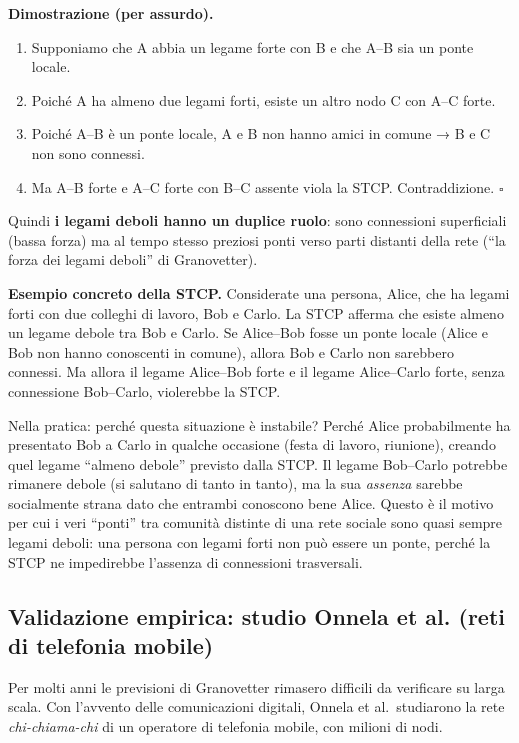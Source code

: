 \documentclass[12pt,a4paper]{article}
\begin{document}
\medskip
\noindent\textbf{Dimostrazione (per assurdo).}
\begin{enumerate}
  \item Supponiamo che A abbia un legame forte con B e che A–B sia un ponte locale.
  \item Poiché A ha almeno due legami forti, esiste un altro nodo C con A–C forte.
  \item Poiché A–B è un ponte locale, A e B non hanno amici in comune → B e C non sono
        connessi.
  \item Ma A–B forte e A–C forte con B–C assente viola la STCP.
        Contraddizione. \quad $\square$
\end{enumerate}
Quindi \textbf{i legami deboli hanno un duplice ruolo}: sono connessioni superficiali (bassa
forza) ma al tempo stesso preziosi ponti verso parti distanti della rete
(``la forza dei legami deboli'' di Granovetter).

\medskip
\noindent\textbf{Esempio concreto della STCP.}
Considerate una persona, Alice, che ha legami forti con due colleghi di lavoro, Bob e Carlo.
La STCP afferma che esiste almeno un legame debole tra Bob e Carlo. Se Alice–Bob fosse un
ponte locale (Alice e Bob non hanno conoscenti in comune), allora Bob e Carlo non sarebbero
connessi. Ma allora il legame Alice–Bob forte e il legame Alice–Carlo forte, senza connessione
Bob–Carlo, violerebbe la STCP.

Nella pratica: perché questa situazione è instabile? Perché Alice probabilmente ha presentato
Bob a Carlo in qualche occasione (festa di lavoro, riunione), creando quel legame ``almeno
debole'' previsto dalla STCP. Il legame Bob–Carlo potrebbe rimanere debole (si salutano di
tanto in tanto), ma la sua \emph{assenza} sarebbe socialmente strana dato che entrambi
conoscono bene Alice. Questo è il motivo per cui i veri ``ponti'' tra comunità distinte
di una rete sociale sono quasi sempre legami deboli: una persona con legami forti non può
essere un ponte, perché la STCP ne impedirebbe l'assenza di connessioni trasversali.

\subsection{Validazione empirica: studio Onnela et al. (reti di telefonia mobile)}

Per molti anni le previsioni di Granovetter rimasero difficili da verificare su larga scala.
Con l'avvento delle comunicazioni digitali, Onnela et al.\ studiarono la rete
\textit{chi-chiama-chi} di un operatore di telefonia mobile, con milioni di nodi.
\end{document}
